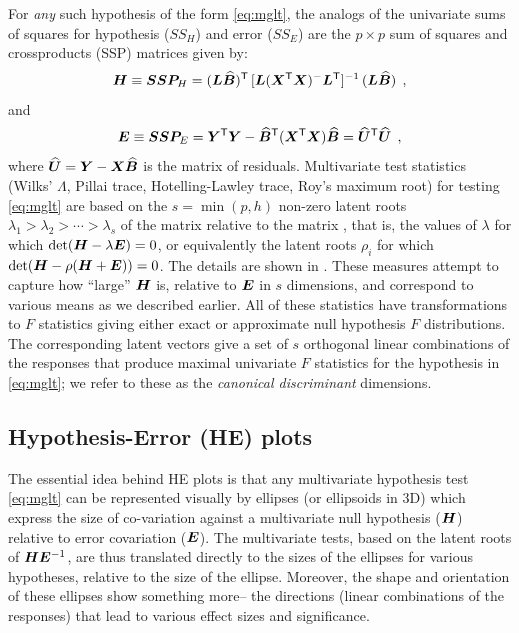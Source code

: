 For \emph{any} such hypothesis of the form \eqref{eq:mglt}, the analogs of the univariate
sums of squares for hypothesis ($SS_H$) and error ($SS_E$)
are the $p \times p$  sum of squares and crossproducts (SSP) matrices given by:
\begin{equation} \label{eq:hmat}
\bm{H}  \equiv \bm{SSP}_H =
 (\bm{L} \widehat{\bm{B}})^\mathsf{T} \,
 [\bm{L} (\bm{X}^\mathsf{T} \bm{X} )^{-} \bm{L}^\mathsf{T}]^{-1} \,
 (\bm{L} \widehat{\bm{B}})
 \:\: ,
\end{equation}
and
\begin{equation} \label{eq:emat}
\bm{E}  \equiv \bm{SSP}_E =
 \bm{Y}^\mathsf{T} \bm{Y} -
 \widehat{\bm{B}}^\mathsf{T} (\bm{X}^\mathsf{T} \bm{X}) \widehat{\bm{B}}
 =
  \widehat{\bm{U}}^\mathsf{T}  \widehat{\bm{U}}
 \:\: ,
\end{equation}
where $\widehat{\bm{U}} = \bm{Y} - \bm{X} \widehat{\bm{B}}$ is the matrix of residuals.
Multivariate test statistics (Wilks' $\Lambda$, Pillai trace, Hotelling-Lawley trace, Roy's maximum root)
for testing \eqref{eq:mglt} are based on the $s = \min(p, h)$ non-zero latent roots 
$\lambda_{1}>\lambda_{2}>\cdots>\lambda_{s}$ of
the matrix  relative to the matrix , that is,
the values of $\lambda$ for which $
\mathrm{det} (\bm{H}-\lambda\bm{E})=0$, or equivalently
the latent roots $\rho_i$ for which $\mathrm{det} (\bm{H} - \rho (\bm{H}+\bm{E}))=0$. 
The details are shown in .
These measures 
attempt to capture how ``large'' $\bm{H}$ is, relative to
$\bm{E}$ in $s$ dimensions, and correspond to various means as we described earlier. 
All of these statistics have transformations to $F$ statistics
giving either exact or approximate null hypothesis $F$ distributions.
The corresponding latent vectors give a
set of $s$ orthogonal linear combinations of the responses that produce
maximal univariate $F$ statistics for the hypothesis in \eqref{eq:mglt};
we refer to these as the \emph{canonical discriminant} dimensions.



\subsection{Hypothesis-Error (HE) plots}
The essential idea behind HE plots is that any multivariate hypothesis
test \eqref{eq:mglt} can be represented visually by ellipses (or ellipsoids in 3D) which express
the size  of co-variation against a multivariate null hypothesis
($\bm{H}$) relative to error covariation ($\bm{E}$).
The multivariate tests, based on the latent roots of $\bm{H} \bm{E}^{-1}$,
are thus translated directly to the sizes of the  ellipses for
various hypotheses, relative to the size of the  ellipse.
Moreover, the shape and orientation of these ellipses show something more-- the
directions (linear combinations of the responses) that lead to
various effect sizes and significance.

